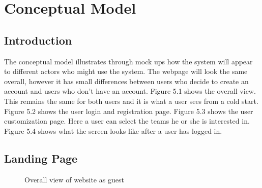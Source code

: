 \chapter{Conceptual Model}

\section{Introduction}
	The conceptual model illustrates through mock ups how the system will appear to different actors who might use the system. The webpage will look the same overall, however it has small differences between users who decide to create an account and users who don’t have an account.  Figure 5.1 shows the overall view. This remains the same for both users and it is what a user sees from a cold start. Figure 5.2 shows the user login and registration page. Figure 5.3 shows the user customization page. Here a user can select the teams he or she is interested in. Figure 5.4 shows what the screen looks like after a user has logged in.

\section{Landing Page}
\begin{figure}[!ht]
      \centering
      \caption{Overall view of website as guest}	
\end{figure}

